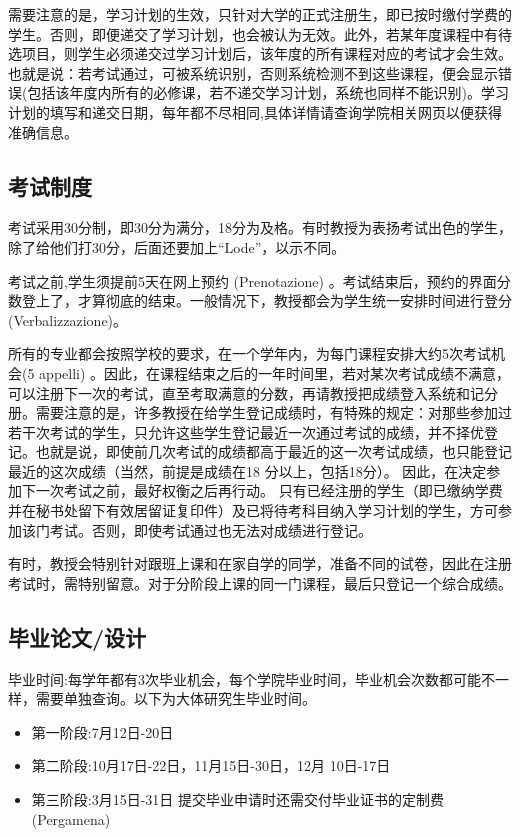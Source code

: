 需要注意的是，学习计划的生效，只针对大学的正式注册生，即已按时缴付学费的学生。否则，即便递交了学习计划，也会被认为无效。此外，若某年度课程中有待选项目，则学生必须递交过学习计划后，该年度的所有课程对应的考试才会生效。也就是说：若考试通过，可被系统识别，否则系统检测不到这些课程，便会显示错误(包括该年度内所有的必修课，若不递交学习计划，系统也同样不能识别)。学习计划的填写和递交日期，每年都不尽相同,具体详情请查询学院相关网页以便获得准确信息。 

\subsection{考试制度}
考试采用30分制，即30分为满分，18分为及格。有时教授为表扬考试出色的学生，除了给他们打30分，后面还要加上“Lode”，以示不同。


考试之前,学生须提前5天在网上预约 (Prenotazione) 。考试结束后，预约的界面分数登上了，才算彻底的结束。一般情况下，教授都会为学生统一安排时间进行登分(Verbalizzazione)。


所有的专业都会按照学校的要求，在一个学年内，为每门课程安排大约5次考试机会(5 appelli) 。因此，在课程结束之后的一年时间里，若对某次考试成绩不满意，可以注册下一次的考试，直至考取满意的分数，再请教授把成绩登入系统和记分册。需要注意的是，许多教授在给学生登记成绩时，有特殊的规定：对那些参加过若干次考试的学生，只允许这些学生登记最近一次通过考试的成绩，并不择优登记。也就是说，即使前几次考试的成绩都高于最近的这一次考试成绩，也只能登记最近的这次成绩（当然，前提是成绩在18 分以上，包括18分）。 因此，在决定参加下一次考试之前，最好权衡之后再行动。 只有已经注册的学生（即已缴纳学费并在秘书处留下有效居留证复印件）及已将待考科目纳入学习计划的学生，方可参加该门考试。否则，即使考试通过也无法对成绩进行登记。 


有时，教授会特别针对跟班上课和在家自学的同学，准备不同的试卷，因此在注册考试时，需特别留意。对于分阶段上课的同一门课程，最后只登记一个综合成绩。

\subsection{毕业论文/设计}

毕业时间:每学年都有3次毕业机会，每个学院毕业时间，毕业机会次数都可能不一样，需要单独查询。以下为大体研究生毕业时间。
\begin{itemize}
\item 第一阶段:7月12日-20日
\item 第二阶段:10月17日-22日，11月15日-30日，12月 10日-17日
\item 第三阶段:3月15日-31日
提交毕业申请时还需交付毕业证书的定制费 (Pergamena) 
\end{itemize}

